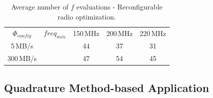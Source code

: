 \documentclass[runningheads,a4paper]{llncs}
\begin{document}



%





%  
%  
%  


\begin{table}
  \caption {Average number of $f$ evaluations - Reconfigurable radio optimization.}  
  \label{tab:radio1}
    \begin{center}
\begin{tabular}{c|cccc} 
\toprule 
	$\Phi_{config}$   & $freq_{min}$ & 150\,MHz & 200\,MHz & 220\,MHz\\\cline{2-5}  
	   5\,MB/s &  & 44 & 37 & 31 \\ 
       300\,MB/s & & 47 & 54 & 45 \\
\bottomrule 
\end{tabular} 
\end{center}
\end{table}

\subsection{Quadrature Method-based Application}
\end{document}
